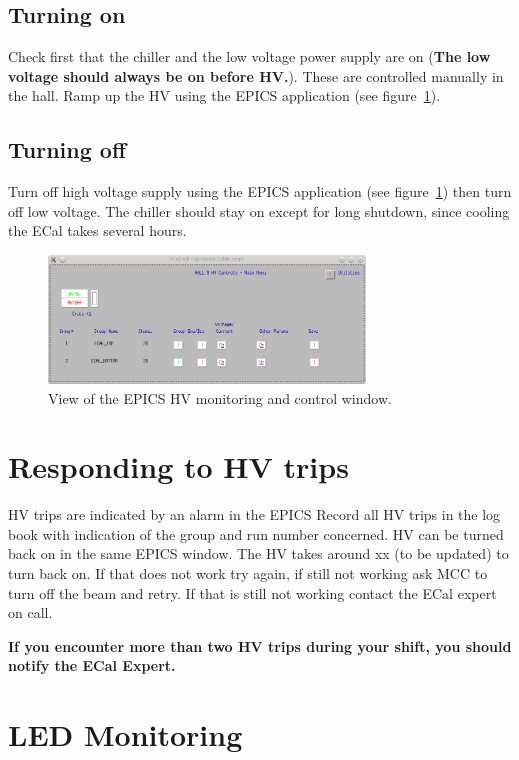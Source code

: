 \documentclass[12pt]{article}
\begin{document}
      \subsection{Turning on}

      Check first that the chiller and the low voltage power supply are on ({\bf The low voltage should always be on before HV.}). These are controlled manually in the hall. Ramp up the HV using the EPICS application (see figure~\ref{HV}).

      \subsection{Turning off}

      Turn off high voltage supply using the EPICS application (see figure~\ref{HV}) then turn off low voltage. The chiller should stay on except for long shutdown, since cooling the ECal takes several hours.

\begin{figure}
\center
\includegraphics[width=0.75\textwidth]{ecaladl.png}
\caption{\small \label{HV} View of the EPICS HV monitoring and control window.}
\end{figure}


   \section{Responding to HV trips}

      HV trips are indicated by an alarm in the EPICS 
      Record all HV trips in the log book with indication of the group and run number concerned. HV can be turned 
      back on in the same EPICS window. The HV takes around xx (to be updated) to turn back on. If 
      that does not work try again, if still not working ask MCC to turn off the beam and retry. If that is 
      still not working contact the ECal expert on call.

      {\bf If you encounter more than two HV trips during your shift, 
      you should notify the ECal Expert.}

   \section{LED Monitoring}
\end{document}
